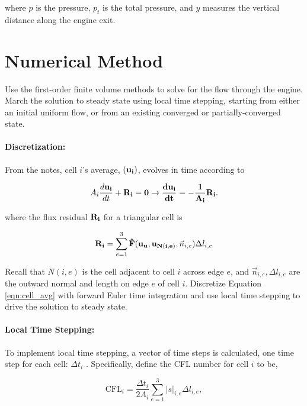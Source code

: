 where $p$ is the pressure, $p_t$ is the total pressure, and $y$ measures the vertical distance along the engine exit.


\pagebreak
\section{Numerical Method}
Use the first-order finite volume methods to solve for the flow through the engine. March the solution to steady state using local time stepping, starting from either an initial uniform flow, or from an existing converged or partially-converged state.

\paragraph{Discretization:} From the notes, cell $i$'s average, $(\bf{u}_i)$, evolves in time according to

\begin{equation}\label{eqn:cell_avg}
    A_i\frac{d\bf{u}_i}{dt} + \bf{R}_i = 0 \rightarrow \frac{d\bf{u}_i}{dt} = -\frac{1}{A_i}\bf{R}_i.
\end{equation}

where the flux residual $\bf{R}_i$ for a triangular cell is

\begin{equation}\label{eqn:flux_residual}
    {\bf{R}_i} = \sum_{e=1}^{3} {\bf{\hat{F}(u_u,u_{N(i,e)}}},\vec{n}_{i,e})\Delta l_{i,e}
\end{equation}

Recall that $N(i,e)$ is the cell adjacent to cell $i$ across edge $e$, and $\vec{n}_{i,e} , \Delta l_{i,e}$ are the outward normal and length on edge $e$ of cell $i$. Discretize Equation \ref{eqn:cell_avg} with forward Euler time integration and use local time stepping to drive the solution to steady state.

\paragraph{Local Time Stepping:} To implement local time stepping, a vector of time steps is calculated,
one time step for each cell: $\Delta t_i$ . Specifically, define the CFL number for cell $i$ to be,

\begin{equation}\label{eqn:CFL}
    \text{CFL}_i = \frac{\Delta t_i}{2A_i}\sum_{e=1}^{3}|s|_{i,e}\Delta l_{i,e},
\end{equation}

